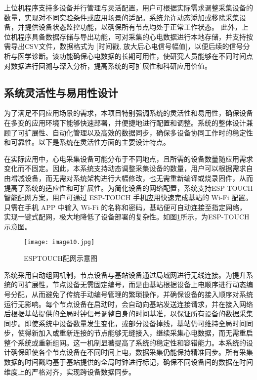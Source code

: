 上位机程序支持多设备并行管理与灵活配置，用户可根据实际需求调整采集设备的数量，实现对不同实验条件或应用场景的适配。系统允许动态添加或移除采集设备，并提供设备状态监控功能，以确保所有节点均处于正常工作状态。 
此外，上位机程序具备数据存储与导出功能，可对采集的心电数据进行本地存储，并支持按需导出CSV文件，数据格式为 [时间戳, 放大后心电信号幅值]，以便后续的信号分析与医学诊断。该功能确保心电数据的长期可用性，使研究人员能够在不同时间点对数据进行回溯与深入分析，提高系统的可扩展性和科研应用价值。

\subsection{系统灵活性与易用性设计}

为了满足不同应用场景的需求，本项目特别强调系统的灵活性和易用性，确保设备在多变的应用环境下能够快速部署，并便捷地进行配置和调整。系统的整体设计兼顾了可扩展性、自动化管理以及高效的数据同步，确保多设备协同工作时的稳定性和可靠性。以下是系统在灵活性方面的主要设计特点。

在实际应用中，心电采集设备可能分布于不同地点，且所需的设备数量随应用需求变化而不固定。因此，本系统支持动态调整采集设备的数量，用户可以根据需求自由增减设备，而无需对系统架构进行大幅修改，也无需重新编译或烧录固件，从而提高了系统的适应性和可扩展性。为简化设备的网络配置，系统支持ESP-TOUCH智能配网方案，用户可通过 ESP-TOUCH 手机应用快速完成基站的 Wi-Fi 配置。只需在手机 APP 中输入 Wi-Fi 的名称和密码，基站便可自动连接至指定网络，实现一键式配网，极大地降低了设备部署的复杂性。如图\ref{F.ECG_image10}所示，为ESP-TOUCH示意图。

\begin{figure}[hbt]
    \centering
    \texttt{[image: image10.jpg]}
    \caption{ESPTOUCH配网示意图}
    \label{F.ECG_image10}
\end{figure}

系统采用自动组网机制，节点设备与基站设备通过局域网进行无线连接。为提升系统的可扩展性，节点设备无需固定编号，而是由基站根据设备上电顺序进行动态编号分配，从而避免了传统手动编号管理的繁琐操作，并确保设备的接入顺序对系统运行无影响。每个节点设备在启动时，会自动向基站发送连接请求，并在接入网络后根据基站提供的全局时钟信号调整自身的时间基准，以保证所有设备的数据采集同步。即使系统中设备数量发生变化，或部分设备掉线，基站仍可维持全局时间同步，使得新加入或重新连接的节点能够无缝接入，继续采集心电数据，而无需重启整个系统或重新组网。这一机制显著提高了系统的稳定性和容错能力。本系统的设计确保即使各个节点设备在不同时间上电，数据采集仍能保持精准同步。所有采集数据的时间戳均基于基站提供的全局时钟进行标记，确保不同设备间的数据在时间维度上的严格对齐，实现跨设备数据同步。

